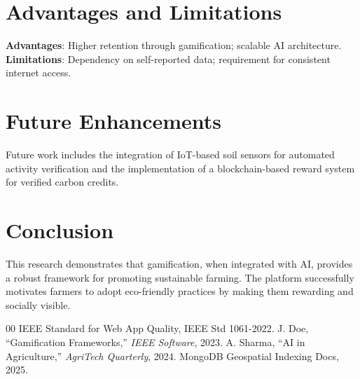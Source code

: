 \documentclass[journal]{IEEEtran}
\begin{document}
\section{Advantages and Limitations}
\textbf{Advantages}: Higher retention through gamification; scalable AI architecture. \\
\textbf{Limitations}: Dependency on self-reported data; requirement for consistent internet access.

\section{Future Enhancements}
Future work includes the integration of IoT-based soil sensors for automated activity verification and the implementation of a blockchain-based reward system for verified carbon credits.

\section{Conclusion}
This research demonstrates that gamification, when integrated with AI, provides a robust framework for promoting sustainable farming. The platform successfully motivates farmers to adopt eco-friendly practices by making them rewarding and socially visible.

\begin{thebibliography}{00}
 IEEE Standard for Web App Quality, IEEE Std 1061-2022.
 J. Doe, ``Gamification Frameworks,'' \textit{IEEE Software}, 2023.
 A. Sharma, ``AI in Agriculture,'' \textit{AgriTech Quarterly}, 2024.
 MongoDB Geospatial Indexing Docs, 2025.
\end{thebibliography}
\end{document}
